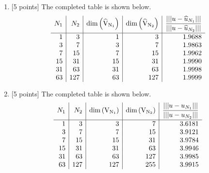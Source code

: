 \begin{solution}
\begin{enumerate}
\item {[5 points]} The completed table is shown below.
\[
\begin{array}{r|r|r|r|r}
N_1 & N_2 & \rm{dim}\left(\widehat{V}_{N_1}\right) & \rm{dim}\left(\widehat{V}_{N_2}\right) & \displaystyle{{\left|\left|\left|u-\widehat{u}_{N_1}\right|\right|\right| \over \left|\left|\left|u-\widehat{u}_{N_2}\right|\right|\right|}}
\\[.75em]
\hline
1 & 3 & 1 & 3 & 1.9688
\\
3 & 7 & 3 & 7 & 1.9863
\\
7 & 15 & 7 & 15 & 1.9962
\\
15 & 31 & 15 & 31 & 1.9990
\\
31 & 63 & 31 & 63 & 1.9998
\\
63 & 127 & 63 & 127 & 1.9999
\end{array}
\]

\vspace*{1em}
\item {[5 points]} The completed table is shown below.
\[
\begin{array}{r|r|r|r|r}
N_1 & N_2 & \rm{dim}\left(V_{N_1}\right) & \rm{dim}\left(V_{N_2}\right) & \displaystyle{{\left|\left|\left|u-u_{N_1}\right|\right|\right| \over \left|\left|\left|u-u_{N_2}\right|\right|\right|}}
\\[.75em]
\hline
1 & 3 & 3 & 7 & 3.6181
\\
3 & 7 & 7 & 15 & 3.9121
\\
7 & 15 & 15 & 31 & 3.9784
\\
15 & 31 & 31 & 63 & 3.9946
\\
31 & 63 & 63 & 127 & 3.9985
\\
63 & 127 & 127 & 255 & 3.9915
\end{array}
\]
\end{enumerate}
\end{solution}

